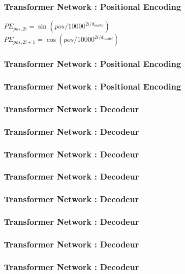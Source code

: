 \documentclass{formation}
\begin{document}
\begin{frame}
  \frametitle{Transformer Network : Positional Encoding}
  $PE_{pos,2i}=\sin{(pos/10000^{2i/d_{model}})}$ \\
  $PE_{pos,2i+1}=\cos{(pos/10000^{2i/d_{model}})}$
\end{frame}

\begin{frame}
  \frametitle{Transformer Network : Positional Encoding}
\end{frame}

\begin{frame}
  \frametitle{Transformer Network : Positional Encoding}
\end{frame}

\begin{frame}
  \frametitle{Transformer Network : Decodeur}
\end{frame}

\begin{frame}
  \frametitle{Transformer Network : Decodeur}
\end{frame}

\begin{frame}
  \frametitle{Transformer Network : Decodeur}
\end{frame}

\begin{frame}
  \frametitle{Transformer Network : Decodeur}
\end{frame}

\begin{frame}
  \frametitle{Transformer Network : Decodeur}
\end{frame}

\begin{frame}
  \frametitle{Transformer Network : Decodeur}
\end{frame}

\begin{frame}
  \frametitle{Transformer Network : Decodeur}
\end{frame}

\begin{frame}
  \frametitle{Transformer Network : Decodeur}
\end{frame}
\end{document}
